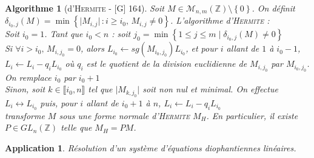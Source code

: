 \documentclass[10pt, a4paper, parskip=full, twoside, twocolumn]{report}
\newtheorem{application}[definition]{Application}
\newtheorem{algorithm}[definition]{Algorithme}
\newcommand{\IZ}{\mathbb{Z}}
\begin{document}
\begin{algorithm}[d'\textsc{Hermite} - \textnormal{[G] 164}]
	Soit $M\in \mathcal{M}_{n,m}(\IZ)\setminus \left\{0\right\}$.
	On définit $\delta_{i_0,j}(M) = \min \left\{\vert M_{i,j}\vert \,\colon i \geq i_0,\, M_{i,j}\neq 0\right\}$.
	L'algorithme d'\textsc{Hermite} : \\

	\emph{Soit $i_0=1$. Tant que $i_0 < n$ : soit $j_0 = \min \left\{1\leq j\leq m \mid \delta_{i_0, j}(M)\neq 0\right\}$} \\
	\indent\indent\emph{Si $\forall i > i_0,\, M_{i,j_0} = 0$, alors $L_{i_0} \longleftarrow sg(M_{i_0, j_0})L_{i_0}$, et pour $i$ allant
	de $1$ à $i_0 - 1$, $L_i \longleftarrow L_i - q_iL_{i_0}$ où $q_i$ est le quotient de la division euclidienne de $M_{i,j_0}$ par $M_{i_0,j_0}$. 
	On remplace $i_0$ par $i_0 + 1$} \\
	\indent\indent\emph{Sinon, soit $k\in \llbracket i_0, n\rrbracket$ tel que $\vert M_{k,j_0}\vert$ soit non nul et minimal.
	On effectue $L_i \longleftrightarrow L_{i_0}$ puis, pour $i$ allant de $i_0+1$ à $n$, $L_i\longleftarrow L_i - q_iL_{i_0}$}
	\\

	transforme $M$ sous une forme normale d'\textsc{Hermite} $M_H$.
	En particulier, il existe $P\in GL_n(\IZ)$ telle que $M_H = PM$.
\end{algorithm}

\begin{application}
	Résolution d'un système d'équations diophantiennes linéaires.
\end{application}
\end{document}
